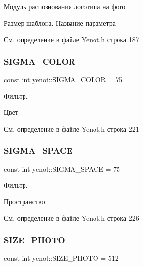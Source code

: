 Модуль распознования логотипа на фото

Размер шаблона. Название параметра 

См. определение в файле Yenot.\+h строка 187

\mbox{\label{namespaceyenot_affd7404833d15c98fbd85249f43f98da}} 
\subsubsection{\texorpdfstring{S\+I\+G\+M\+A\+\_\+\+C\+O\+L\+OR}{SIGMA\_COLOR}}
{\footnotesize\ttfamily const int yenot\+::\+S\+I\+G\+M\+A\+\_\+\+C\+O\+L\+OR = 75}

Фильтр.

Цвет 

См. определение в файле Yenot.\+h строка 221

\mbox{\label{namespaceyenot_ad45191f613b95ca3398e6eab5e202406}} 
\subsubsection{\texorpdfstring{S\+I\+G\+M\+A\+\_\+\+S\+P\+A\+CE}{SIGMA\_SPACE}}
{\footnotesize\ttfamily const int yenot\+::\+S\+I\+G\+M\+A\+\_\+\+S\+P\+A\+CE = 75}

Фильтр.

Пространство 

См. определение в файле Yenot.\+h строка 226

\mbox{\label{namespaceyenot_a501462c649059c5efe3019823a607670}} 
\subsubsection{\texorpdfstring{S\+I\+Z\+E\+\_\+\+P\+H\+O\+TO}{SIZE\_PHOTO}}
{\footnotesize\ttfamily const int yenot\+::\+S\+I\+Z\+E\+\_\+\+P\+H\+O\+TO = 512}

